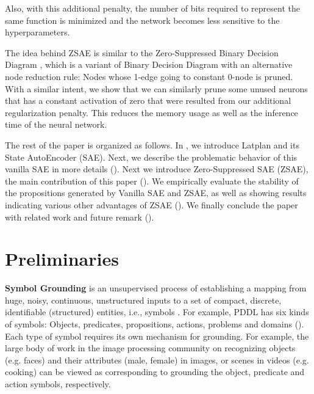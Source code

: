 Also, with this additional penalty, the number of bits required to represent the same function
is minimized and the network becomes less sensitive to the hyperparameters.

The idea behind ZSAE is similar to the Zero-Suppressed Binary Decision Diagram \cite{minato1993zero},
which is a variant of Binary Decision Diagram \cite{bryant1986graph} with an alternative node reduction rule:
Nodes whose 1-edge going to constant 0-node is pruned.
With a similar intent, we show that we can similarly prune some unused neurons
that has a constant activation of zero
that were resulted from our additional regularization penalty.
This reduces the memory usage as well as the inference time of the neural network.

The rest of the paper is organized as follows.
In , we introduce Latplan \cite{Asai2018} and its State AutoEncoder (SAE).
Next, we describe the problematic behavior of this vanilla SAE in more details ().
Next we introduce Zero-Suppressed SAE (ZSAE), the main contribution of this paper ().
We empirically evaluate the stability of the propositions generated by Vanilla SAE and ZSAE,
as well as showing results indicating various other advantages of ZSAE ().
We finally conclude the paper with related work and future remark ().


\section{Preliminaries}
\label{background}

\textbf{Symbol Grounding} is an unsupervised process of establishing a mapping
from huge, noisy, continuous, unstructured inputs
to a set of compact, %
discrete, identifiable (structured) entities, i.e., symbols \cite{Asai2018}.
For example, PDDL has six kinds of symbols: Objects, predicates, propositions, actions, problems and domains ().
Each type of symbol requires its own mechanism for grounding.
For example, the large body of work in the image processing community on recognizing 
objects (e.g. faces) and their attributes (male, female) in images, or scenes in videos (e.g. cooking)
can be viewed as corresponding to grounding the object, predicate and action symbols, respectively.

